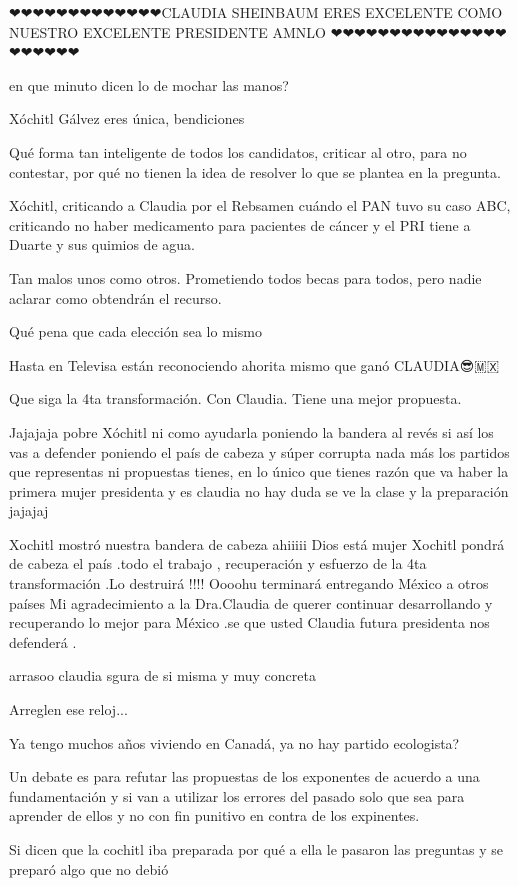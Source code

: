 ❤❤❤❤❤❤❤❤❤❤❤❤❤CLAUDIA SHEINBAUM ERES EXCELENTE COMO NUESTRO EXCELENTE PRESIDENTE AMNLO ❤❤❤❤❤❤❤❤❤❤❤❤❤❤❤❤❤❤❤❤❤

en que minuto dicen lo de mochar las manos?

Xóchitl Gálvez eres única, bendiciones

Qué forma tan inteligente de todos los candidatos, criticar al otro, para no contestar, por qué no tienen la idea de resolver lo que se plantea en la pregunta.

Xóchitl, criticando a Claudia por el Rebsamen cuándo el PAN tuvo su caso ABC, criticando no haber medicamento para pacientes de cáncer y el PRI tiene a Duarte y sus quimios de agua. 

Tan malos unos como otros. Prometiendo todos becas para todos, pero nadie aclarar como obtendrán el recurso. 

Qué pena que cada elección sea lo mismo

Hasta en Televisa están reconociendo ahorita mismo que ganó CLAUDIA😎🇲🇽

Que siga la 4ta transformación. Con Claudia. Tiene una mejor propuesta.

Jajajaja pobre Xóchitl ni como ayudarla poniendo la bandera al revés si así los vas a defender poniendo el país de cabeza y súper corrupta nada más los partidos que  representas ni propuestas tienes, en lo único que tienes razón que va haber la primera mujer presidenta y es claudia no hay duda se ve la clase y la preparación jajajaj

Xochitl mostró  nuestra bandera de cabeza ahiiiii Dios está mujer Xochitl pondrá de cabeza el país  .todo el trabajo , recuperación y esfuerzo de la 4ta transformación  .Lo destruirá !!!!  Oooohu terminará entregando México a otros países Mi agradecimiento a la Dra.Claudia de querer continuar  desarrollando y recuperando lo mejor para México .se que usted Claudia  futura presidenta nos defenderá .

arrasoo claudia sgura de si misma y muy concreta

Arreglen ese reloj...

Ya tengo muchos años viviendo en Canadá, ya no hay partido ecologista?

Un debate es para refutar las propuestas de los exponentes de acuerdo a una fundamentación y si van a utilizar los errores del pasado solo que sea para aprender de ellos y no con fin punitivo en contra de los expinentes.

Si dicen que la cochitl iba preparada por qué a ella le pasaron las preguntas y se preparó algo que no debió

